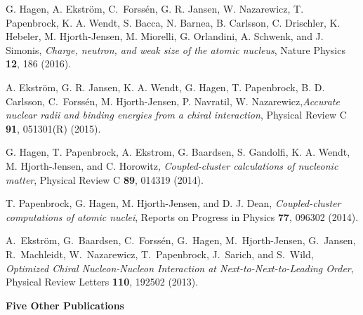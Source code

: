 \begin{numberedlist}


\item  G. Hagen, A. Ekstr\"om, C.\ Forss\'en, G. R. Jansen, W. Nazarewicz, T. Papenbrock, K. A. Wendt, S. Bacca, N. Barnea, B. Carlsson, C. Drischler, K. Hebeler, M. Hjorth-Jensen, M. Miorelli, G. Orlandini, A. Schwenk, and J. Simonis, {\em Charge, neutron, and weak size of the atomic nucleus}, Nature Physics {\bf 12}, 186 (2016).


\item  A. Ekstr\"om, G. R. Jansen, K. A. Wendt, G. Hagen, T. Papenbrock, B. D. Carlsson, C.\ Forss\'en, M. Hjorth-Jensen, P. Navratil, W. Nazarewicz,{\em Accurate nuclear radii and binding energies from a chiral interaction}, Physical Review C {\bf 91}, 051301(R) (2015).

\item G. Hagen, T. Papenbrock, A. Ekstrom, G. Baardsen, S. Gandolfi, K. A. Wendt, M. Hjorth-Jensen, and C. Horowitz, {\em Coupled-cluster calculations of nucleonic matter}, Physical Review C {\bf 89}, 014319 (2014).


\item T. Papenbrock, G. Hagen, M. Hjorth-Jensen, and D. J. Dean, {\em Coupled-cluster computations of atomic nuclei}, Reports on Progress in Physics {\bf 77}, 096302 (2014).

\item A.~Ekstr\"om, G.\ Baardsen, C.\ Forss\'en, G.\ Hagen, M.\	Hjorth-Jensen, G.\ Jansen, R.\ Machleidt, W.\ Nazarewicz, 
 T.\ Papenbrock, J.\ Sarich, and S.\ Wild, {\em Optimized Chiral Nucleon-Nucleon Interaction at Next-to-Next-to-Leading Order}, Physical Review Letters {\bf 110}, 192502 (2013).



\end{numberedlist}


\noindent
{\bf Five Other Publications}
\vspace*{-8pt}

